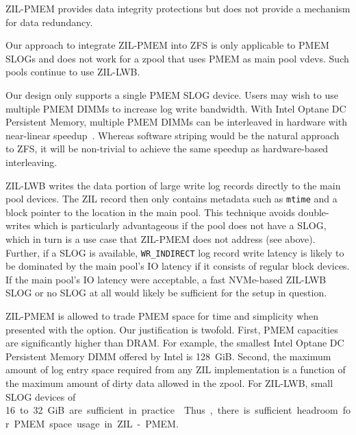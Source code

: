 \documentclass[12pt,a4paper,twoside]{book}
\begin{document}
ZIL-PMEM provides data integrity protections but does not provide a mechanism for data redundancy.

Our approach to integrate ZIL-PMEM into ZFS is only applicable to PMEM SLOGs and does not work for a zpool that uses PMEM as main pool vdevs.
Such pools continue to use ZIL-LWB.

Our design only supports a single PMEM SLOG device.
Users may wish to use multiple PMEM DIMMs to increase log write bandwidth.
With Intel Optane DC Persistent Memory, multiple PMEM DIMMs can be interleaved in hardware with near-linear speedup~\cite{yangEmpiricalGuideBehavior2020}.
Whereas software striping would be the natural approach to ZFS, it will be non-trivial to achieve the same speedup as hardware-based interleaving.

ZIL-LWB writes the data portion of large write log records directly to the main pool devices.
The ZIL record then only contains metadata such as \lstinline{mtime} and a block pointer to the location in the main pool.
This technique avoids double-writes which is particularly advantageous if the pool does not have a SLOG, which in turn is a use case that ZIL-PMEM does not address (see above).
Further, if a SLOG is available, \lstinline{WR_INDIRECT} log record write latency is likely to be dominated by the main pool's IO latency if it consists of regular block devices.
If the main pool's IO latency were acceptable, a fast NVMe-based ZIL-LWB SLOG or no SLOG at all would likely be sufficient for the setup in question.

ZIL-PMEM is allowed to trade PMEM space for time and simplicity when presented with the option.
Our justification is twofold.
First, PMEM capacities are significantly higher than DRAM.
For example, the smallest Intel Optane DC Persistent Memory DIMM offered by Intel is 128~GiB.
Second, the maximum amount of log entry space required from any ZIL implementation is a function of the maximum amount of dirty data allowed in the zpool.
For ZIL-LWB, small SLOG devices of \SI{16} to 32~GiB are sufficient in practice \cite{OpenZFSDocsWorkloadTuningSynchronousIO}.
Thus, there is sufficient headroom for PMEM space usage in ZIL-PMEM.
\end{document}
